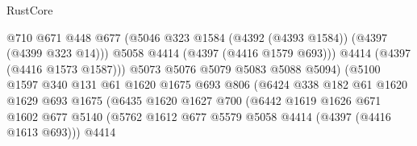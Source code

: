 \begin{lexlean}{RustCore}
\begin{coremodule}
                                        @710
                                        @671
                                        @448
                                        @677
                                        (@5046
                                          @323
                                          @1584
                                          (@4392 (@4393 @1584))
                                          (@4397 (@4399 @323 @14)))
                                        @5058
                                        @4414
                                        (@4397 (@4416 @1579 @693)))
                                      @4414
                                      (@4397 (@4416 @1573 @1587)))
                                    @5073
                                    @5076
                                    @5079
                                    @5083
                                    @5088
                                    @5094)
                                  (@5100
                                    @1597
                                    @340
                                    @131
                                    @61
                                    @1620
                                    @1675
                                    @693
                                    @806
                                    (@6424
                                      @338
                                      @182
                                      @61
                                      @1620
                                      @1629
                                      @693
                                      @1675
                                      (@6435
                                        @1620
                                        @1627
                                        @700
                                        (@6442
                                          @1619
                                          @1626
                                          @671
                                          @1602
                                          @677
                                          @5140
                                          (@5762
                                            @1612
                                            @677
                                            @5579
                                            @5058
                                            @4414
                                            (@4397 (@4416 @1613 @693)))
                                          @4414

\end{coremodule}
\end{lexlean}
